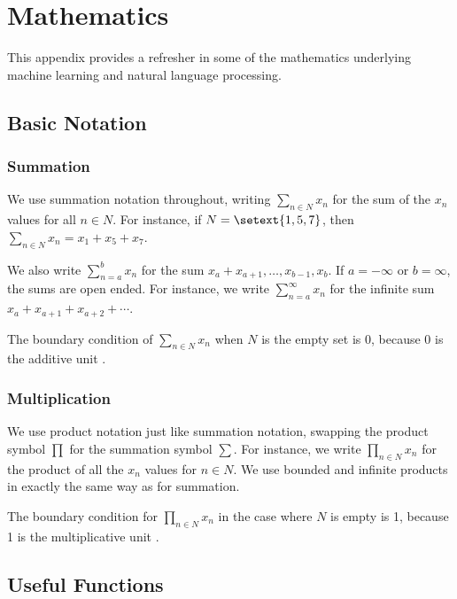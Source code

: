 \chapter{Mathematics}\label{chapter:maths}

This appendix provides a refresher in some of the mathematics
underlying machine learning and natural language processing.

\section{Basic Notation}

\subsection{Summation}

We use summation notation throughout, writing $\sum_{n \in N}
x_n$ for the sum of the $x_n$ values for all $n \in N$.  For instance,
if $N = \setext{1,5,7}$, then $\sum_{n \in N} x_n = x_1 + x_5 + x_7$.

We also write $\sum_{n=a}^b x_n$ for the sum $x_a + x_{a+1}, \ldots,
x_{b-1}, x_{b}$.  If $a = -\infty$ or $b = \infty$, the sums are open
ended.  For instance, we write $\sum_{n=a}^{\infty} x_n$ for the
infinite sum $x_a + x_{a+1} + x_{a+2} + \cdots$.

The boundary condition of $\sum_{n \in N} x_n$ when $N$ is the empty
set is 0, because 0 is the additive unit .


\subsection{Multiplication}

We use product notation just like summation notation, swapping the
product symbol $\prod$ for the summation symbol $\sum$.  For instance,
we write $\prod_{n \in N} x_n$ for the product of all the $x_n$ values
for $n \in N$.  We use bounded and infinite products in exactly the
same way as for summation.

The boundary condition for $\prod_{n \in N} x_n$ in the case where $N$
is empty is 1, because 1 is the multiplicative unit .




\section{Useful Functions}


